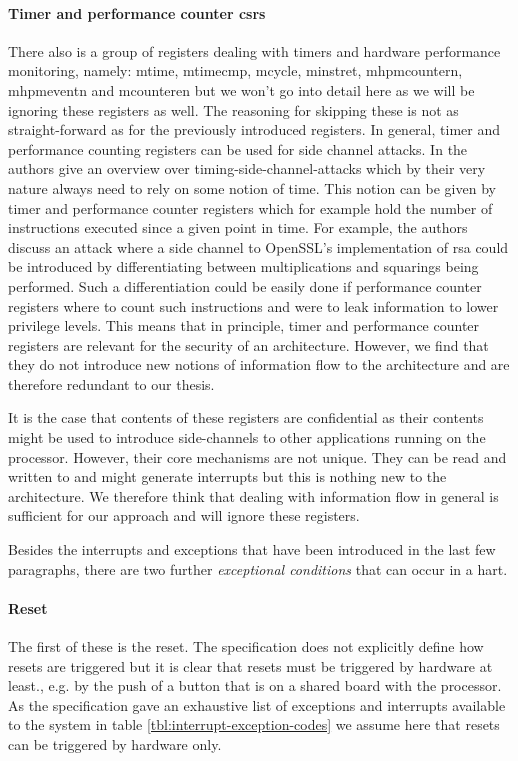 \paragraph{Timer and performance counter \glspl{csr}}
There also is a group of registers dealing with timers and hardware performance monitoring, namely: \gls{mtime}, \gls{mtimecmp}, \gls{mcycle}, \gls{minstret}, \gls{mhpmcountern}, \gls{mhpmeventn} and \gls{mcounteren} but we won't go into detail here as we will be ignoring these registers as well.
The reasoning for skipping these is not as straight-forward as for the previously introduced registers.
In general, timer and performance counting registers can be used for side channel attacks.
In \cite{Qian16} the authors give an overview over timing-side-channel-attacks which by their very nature always need to rely on some notion of time.
This notion can be given by timer and performance counter registers which for example hold the number of instructions executed since a given point in time.
For example, the authors discuss an attack where a side channel to OpenSSL's implementation of \gls{rsa} could be introduced by differentiating between multiplications and squarings being performed.
Such a differentiation could be easily done if performance counter registers where to count such instructions and were to leak information to lower privilege levels.
This means that in principle, timer and performance counter registers are relevant for the security of an architecture.
However, we find that they do not introduce new notions of information flow to the architecture and are therefore redundant to our thesis.

It is the case that contents of these registers are confidential as their contents might be used to introduce side-channels to other applications running on the processor.
However, their core mechanisms are not unique.
They can be read and written to and might generate interrupts but this is nothing new to the architecture.
We therefore think that dealing with information flow in general is sufficient for our approach and will ignore these registers.

Besides the interrupts and exceptions that have been introduced in the last few paragraphs, there are two further \textit{exceptional conditions} that can occur in a \gls{hart}.

\paragraph{Reset}
The first of these is the reset.
The specification does not explicitly define how resets are triggered but it is clear that resets must be triggered by hardware at least., e.g. by the push of a button that is on a shared board with the processor.
As the specification gave an exhaustive list of exceptions and interrupts available to the system in table \ref{tbl:interrupt-exception-codes} we assume here that resets can be triggered by hardware only.

